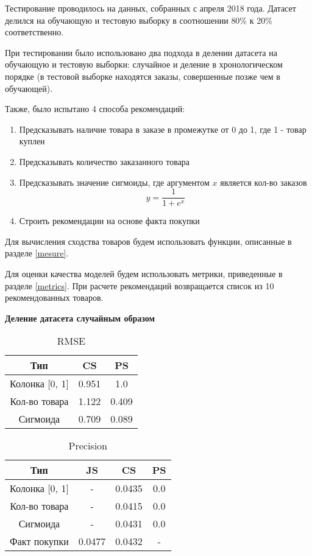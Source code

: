 Тестирование проводилось на данных, собранных с апреля 2018 года. Датасет делился
на обучающую и тестовую выборку в соотношении 80\% к 20\% соответственно.


При тестировании было использовано два подхода в делении датасета на обучающую
и тестовую выборки: случайное и деление в хронологическом порядке (в тестовой
выборке находятся заказы, совершенные позже чем в обучающей).

Также, было испытано 4 способа рекомендаций:
\begin{enumerate}
  \item Предсказывать наличие товара в заказе в промежутке от 0 до 1, где 1 - товар куплен
  \item Предсказывать количество заказанного товара
  \item Предсказывать значение сигмоиды, где аргументом $x$ является кол-во заказов
  \begin{equation}
    y = \frac{1}{1 + e^x}
  \end{equation}
  \item Строить рекомендации на основе факта покупки
\end{enumerate}
Для вычисления сходства товаров будем использовать функции, описанные в разделе \ref{mesure}.

Для оценки качества моделей будем использовать метрики, приведенные в разделе \ref{metrics}.
При расчете рекомендаций возвращается список из 10 рекомендованных товаров.


\textbf{Деление датасета случайным образом}

\begin{table}[H]
  \centering
  \begin{tabular} { | c | c | c | }
    \hline
    Тип & CS & PS \\
    \hline
    Колонка [0, 1] & 0.951 & 1.0 \\
    \hline
    Кол-во товара & 1.122 & 0.409 \\
    \hline
    Сигмоида & 0.709 & 0.089 \\
    \hline
  \end{tabular}
  \caption{RMSE}
\end{table}

\begin{table}[H]
  \centering
  \begin{tabular} { | c | c | c | c | }
    \hline
    Тип & JS & CS & PS \\
    \hline
    Колонка [0, 1] & - & 0.0435 & 0.0 \\
    \hline
    Кол-во товара & - & 0.0415 & 0.0 \\
    \hline
    Сигмоида & - & 0.0431 & 0.0 \\
    \hline
    Факт покупки & 0.0477 & 0.0432 & - \\
    \hline
  \end{tabular}
  \caption{Precision}
\end{table}


